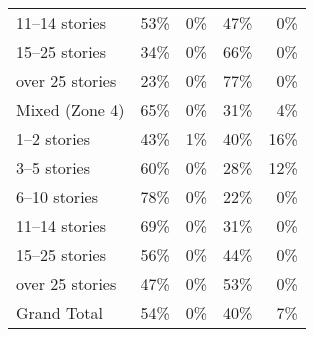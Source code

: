 \begin{table}
\begin{tabular}{lrrrr}
11--14 stories    & 53\%                     & 0\%                                & 47\%                             & 0\%                              \\
15--25 stories    & 34\%                     & 0\%                                & 66\%                             & 0\%                              \\
over 25 stories  & 23\%                     & 0\%                                & 77\%                             & 0\%                              \\ \hline
Mixed (Zone 4)   & 65\%                     & 0\%                                & 31\%                             & 4\%                              \\ \hline
1--2 stories      & 43\%                     & 1\%                                & 40\%                             & 16\%                             \\
3--5 stories      & 60\%                     & 0\%                                & 28\%                             & 12\%                             \\
6--10 stories     & 78\%                     & 0\%                                & 22\%                             & 0\%                              \\
11--14 stories    & 69\%                     & 0\%                                & 31\%                             & 0\%                              \\
15--25 stories    & 56\%                     & 0\%                                & 44\%                             & 0\%                              \\
over 25 stories  & 47\%                     & 0\%                                & 53\%                             & 0\%                              \\ \hline
Grand Total      & 54\%                     & 0\%                                & 40\%                             & 7\%                             
\end{tabular}
\end{table}
